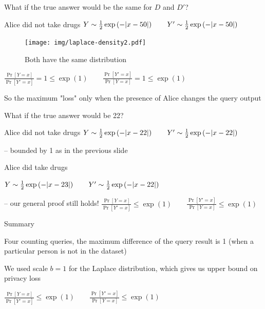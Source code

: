 \documentclass[12pt,aspectratio=169,handout]{beamer}
\begin{document}
\begin{frame}{What if the true answer would be the same for $D$ and $D'$?}

Alice did not take drugs
$
Y \sim  \frac{1}{2} \exp \left(- \abs{x - 50} \right) \qquad
Y' \sim \frac{1}{2} \exp \left(- \abs{x - 50} \right) 
$

\begin{figure}
\centering
\texttt{[image: img/laplace-density2.pdf]}
\caption{Both have the same distribution}
\end{figure}

$
\frac{\Pr[Y = x]}{\Pr[Y' = x]} = 1 \leq \exp(1) \qquad
\frac{\Pr[Y' = x]}{\Pr[Y = x]} = 1 \leq \exp(1)
$

So the maximum "loss" only when the presence of Alice changes the query output

\end{frame}


\begin{frame}{What if the true answer would be 22?}

Alice did not take drugs
$
Y \sim  \frac{1}{2} \exp \left(- \abs{x - 22} \right) \qquad
Y' \sim \frac{1}{2} \exp \left( -\abs{x - 22} \right) 
$

-- bounded by 1 as in the previous slide 

Alice did take drugs

$Y \sim  \frac{1}{2} \exp \left(- \abs{x - 23} \right) \qquad
Y' \sim \frac{1}{2} \exp \left(- \abs{x - 22} \right)$

-- our general proof still holds!
$
\frac{\Pr[Y = x]}{\Pr[Y' = x]} \leq \exp(1) \qquad
\frac{\Pr[Y' = x]}{\Pr[Y = x]} \leq \exp(1)
$

\end{frame}


\begin{frame}{Summary}

Four counting queries, the maximum difference of the query result is 1 (when a particular person is not in the dataset)

We used scale $b = 1$ for the Laplace distribution, which gives us upper bound on privacy loss

$
\frac{\Pr[Y = x]}{\Pr[Y' = x]} \leq \exp(1) \qquad
\frac{\Pr[Y' = x]}{\Pr[Y = x]} \leq \exp(1)
$

\end{frame}
\end{document}
